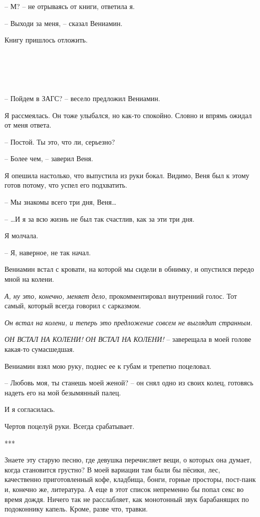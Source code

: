 \documentclass[
]{book}
\begin{document}
-- М? -- не отрываясь от книги, ответила я.

-- Выходи за меня, -- сказал Вениамин.

Книгу пришлось отложить.

\hypertarget{chapter-13}{%
\chapter{~}\label{chapter-13}}

-- Пойдем в ЗАГС? -- весело предложил Вениамин.

Я рассмеялась. Он тоже улыбался, но как-то спокойно. Словно и впрямь ожидал от меня ответа.

-- Постой. Ты это, что ли, серьезно?

-- Более чем, -- заверил Веня.

Я опешила настолько, что выпустила из руки бокал. Видимо, Веня был к этому готов потому, что успел его подхватить.

-- Мы знакомы всего три дня, Веня\ldots{}

-- \ldots И я за всю жизнь не был так счастлив, как за эти три дня.

Я молчала.

-- Я, наверное, не так начал.

Вениамин встал с кровати, на которой мы сидели в обнимку, и опустился передо мной на колени.

\emph{А, ну это, конечно, меняет дело}, прокомментировал внутренний голос. Тот самый, который всегда говорил с сарказмом.

\emph{Он встал на колени, и теперь это предложение совсем не выглядит странным.}

\emph{ОН ВСТАЛ НА КОЛЕНИ! ОН ВСТАЛ НА КОЛЕНИ!} -- заверещала в моей голове какая-то сумасшедшая.

Вениамин взял мою руку, поднес ее к губам и трепетно поцеловал.

-- Любовь моя, ты станешь моей женой? -- он снял одно из своих колец, готовясь надеть его на мой безымянный палец.

И я согласилась.

Чертов поцелуй руки. Всегда срабатывает.

***

Знаете эту старую песню, где девушка перечисляет вещи, о которых она думает, когда становится грустно? В моей вариации там были бы пёсики, лес, качественно приготовленный кофе, кладбища, бонги, горные просторы, пост-панк и, конечно же, литература. А еще в этот список непременно бы попал секс во время дождя. Ничего так не расслабляет, как монотонный звук барабанящих по подоконнику капель. Кроме, разве что, травки.
\end{document}

